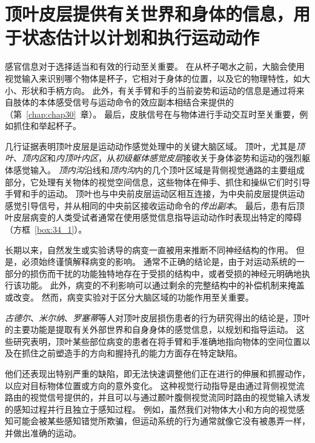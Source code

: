 \section{顶叶皮层提供有关世界和身体的信息，用于状态估计以计划和执行运动动作}

感官信息对于选择适当和有效的行动至关重要。
在从杯子喝水之前，大脑会使用视觉输入来识别哪个物体是杯子，它相对于身体的位置，以及它的物理特性，如大小、形状和手柄方向。
此外，有关手臂和手的当前姿势和运动的信息是通过将来自肢体的本体感受信号与运动命令的效应副本相结合来提供的（第~\ref{chap:chap30}~章）。
最后，皮肤信号在与物体进行手动交互时至关重要，例如抓住和举起杯子。


几行证据表明顶叶皮层是运动动作感觉处理中的关键大脑区域。
顶叶，尤其是\textit{顶叶}、\textit{顶内区}和\textit{内顶叶内区}，从\textit{初级躯体感觉皮层}接收关于身体姿势和运动的强烈躯体感觉输入。
\textit{顶内沟}沿线和\textit{顶内沟}内的几个顶叶区域是背侧视觉通路的主要组成部分，它处理有关物体的视觉空间信息，这些物体在伸手、抓住和操纵它们时引导手臂和手的运动。
顶叶也与中央前皮层运动区相互连接，为中央前皮层提供运动感觉引导信号，并从相同的中央前区接收运动命令的\textit{传出副本}。
最后，患有后顶叶皮层病变的人类受试者通常在使用感觉信息指导运动动作时表现出特定的障碍（方框~\ref{box:34_1}）。



\begin{proposition}[后顶叶皮层的病变研究导致使用感觉信息指导行动的缺陷] \label{box:34_1}
	
	\quad \quad 长期以来，自然发生或实验诱导的病变一直被用来推断不同神经结构的作用。
	但是，必须始终谨慎解释病变的影响。
	通常不正确的结论是，由于对运动系统的一部分的损伤而干扰的功能独特地存在于受损的结构中，或者受损的神经元明确地执行该功能。
	此外，病变的不利影响可以通过剩余的完整结构中的补偿机制来掩盖或改变。
	然而，病变实验对于区分大脑区域的功能作用至关重要。
	
	\quad \textit{古德尔}、\textit{米尔纳}、\textit{罗塞蒂}等人对顶叶皮层损伤患者的行为研究得出的结论是，顶叶的主要功能是提取有关外部世界和自身身体的感觉信息，以规划和指导运动。
	这些研究表明，顶叶某些部位病变的患者在将手臂和手准确地指向物体的空间位置以及在抓住之前塑造手的方向和握持孔的能力方面存在特定缺陷。
	
	\quad \quad 他们还表现出特别严重的缺陷，即无法快速调整他们正在进行的伸展和抓握动作，以应对目标物体位置或方向的意外变化。
	这种视觉行动指导是由通过背侧视觉流路由的视觉信号提供的，并且可以与通过颞叶腹侧视觉流同时路由的视觉输入诱发的感知过程并行且独立于感知过程。
	例如，虽然我们对物体大小和方向的视觉感知可能会被某些感知错觉所欺骗，但运动系统的行为通常就像它没有被愚弄一样，并做出准确的运动。
	
\end{proposition}



